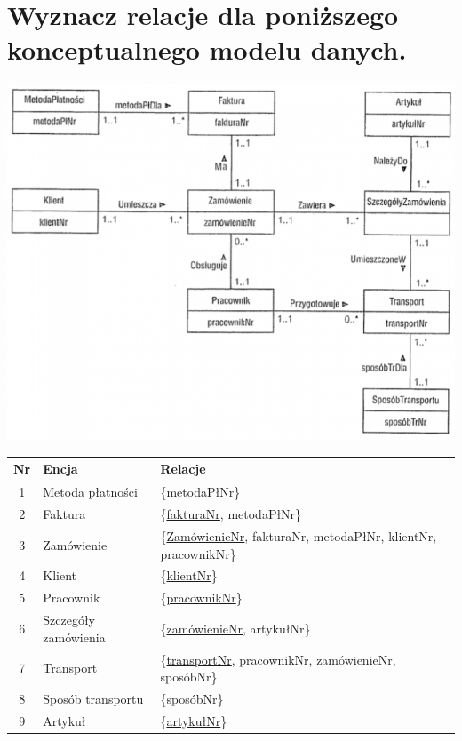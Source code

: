 \documentclass[a4paper,11pt]{article}
\begin{document}
\section{Wyznacz relacje dla poniższego konceptualnego modelu danych.}
\begin{center}
  \vspace{5mm}
  \includegraphics[scale=0.7]{7-4}

  \vspace{3cm}

  \begin{tabular}{|c|l|l|}
  \hline
  Nr & Encja & Relacje \\ \hline
  1 & Metoda płatności & \{\underline{metodaPłNr}\} \\ \hline
  2 & Faktura &\{\underline{fakturaNr}, metodaPłNr\} \\ \hline
  3 & Zamówienie & \{\underline{ZamówienieNr}, fakturaNr, metodaPłNr, klientNr, pracownikNr\} \\ \hline
  4 & Klient & \{\underline{klientNr}\} \\ \hline
  5 & Pracownik & \{\underline{pracownikNr}\} \\ \hline
  6 & Szczegóły zamówienia & \{\underline{zamówienieNr}, artykułNr\} \\ \hline
  7 & Transport & \{\underline{transportNr}, pracownikNr, zamówienieNr, sposóbNr\} \\ \hline
  8 & Sposób transportu & \{\underline{sposóbNr}\} \\ \hline
  9 & Artykuł & \{\underline{artykułNr}\} \\ \hline
  \end{tabular}
\end{center}
\end{document}
